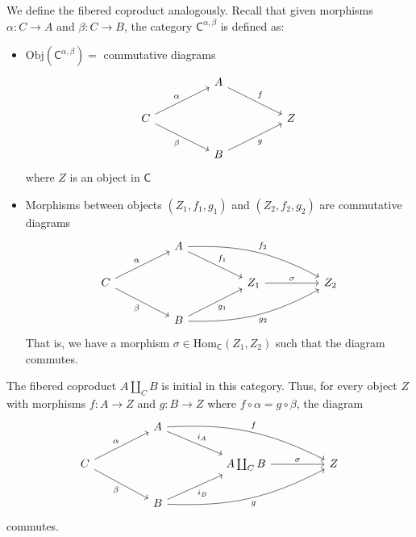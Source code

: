 \documentclass[../../master.tex]{subfiles}
\begin{document}
\begin{solution}
      We define the fibered coproduct analogously.
      Recall that given morphisms \(\alpha: C \to A\) and \(\beta: C \to B\),
      the category \(\mathsf{C}^{\alpha, \beta}\) is defined as:
      \begin{itemize}
        \item \(\text{Obj}(\mathsf{C}^{\alpha, \beta}) = \) commutative diagrams
        \[
        \begin{tikzcd}
	        && {A} \\
	        {C} &&&& {Z} \\
	        && {B}
	        \arrow["{\alpha}", from=2-1, to=1-3]
	        \arrow["{\beta}"', from=2-1, to=3-3]
	        \arrow["{f}", from=1-3, to=2-5]
	        \arrow["{g}"', from=3-3, to=2-5]
        \end{tikzcd}
        \]
        where \(Z\) is an object in \(\mathsf{C}\)
        \item Morphisms between objects \((Z_{1}, f_{1}, g_{1})\) and \((Z_{2}, f_{2}, g_{2})\) are commutative diagrams
        \[
        \begin{tikzcd}
	        && {A} \\
	        {C} &&&& {Z_{1}} && {Z_{2}} \\
	        && {B}
	        \arrow["{\alpha}", from=2-1, to=1-3]
	        \arrow["{\beta}"', from=2-1, to=3-3]
	        \arrow["{f_{1}}", from=1-3, to=2-5]
	        \arrow["{g_{1}}"', from=3-3, to=2-5]
	        \arrow["{f_{2}}", from=1-3, to=2-7, bend left=15]
	        \arrow["{g_{2}}"', from=3-3, to=2-7, bend right=15]
	        \arrow["{\sigma}", from=2-5, to=2-7]
        \end{tikzcd}
        \]
        That is, we have a morphism \(\sigma \in \text{Hom}_{\mathsf{C}}(Z_{1}, Z_{2})\) such that the diagram commutes.
      \end{itemize}

      The fibered coproduct \(A \coprod_{C} B\) is initial in this category.
      Thus, for every object \(Z\) with morphisms \(f: A \to Z\) and \(g: B \to Z\) where \(f \circ \alpha = g \circ \beta\), the diagram
      \[
      \begin{tikzcd}
        && {A} \\
        {C} &&&& {A \coprod_{C} B} && {Z} \\
        && {B}
        \arrow["{\alpha}", from=2-1, to=1-3]
        \arrow["{\beta}"', from=2-1, to=3-3]
        \arrow["{i_{A}}", from=1-3, to=2-5]
        \arrow["{i_{B}}"', from=3-3, to=2-5]
        \arrow["{f}", from=1-3, to=2-7, bend left=15]
        \arrow["{g}"', from=3-3, to=2-7, bend right=15]
        \arrow["{\sigma}", from=2-5, to=2-7]
      \end{tikzcd}
      \]
      commutes.


\end{solution}
\end{document}
